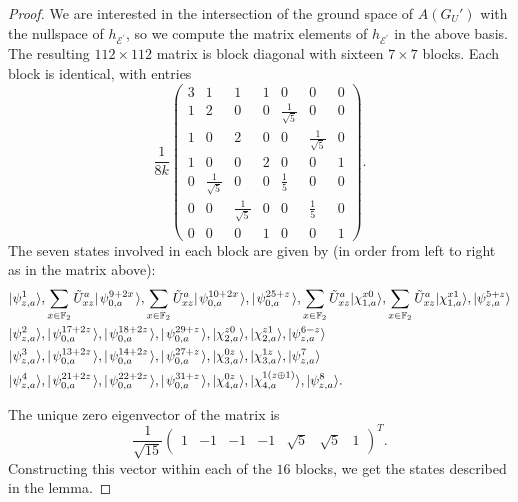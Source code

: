\documentclass[../thesis-main/thesis-main]{subfiles}
\begin{document}
\begin{proof}
We are interested in the intersection of the ground space of $A(G_U')$ with the nullspace of $h_{\mathcal{E}^{\prime}}$, so we compute the matrix elements of $h_{\mathcal{E}^{\prime}}$ in the above basis. The resulting $112\times 112$ matrix is block diagonal with sixteen $7\times 7$ blocks. Each block is identical, with entries
\begin{equation} \frac{1}{8k}
\begin{pmatrix}
  3 & 1 & 1 &1 & 0 & 0 & 0\\ 
  1 & 2 & 0 & 0 & \frac{1}{\sqrt{5}} & 0 & 0\\
  1 & 0 & 2 & 0 & 0 & \frac{1}{\sqrt{5}} & 0\\
  1 & 0 & 0 & 2 & 0 & 0 & 1\\
  0 & \frac{1}{\sqrt{5}} & 0 & 0 & \frac{1}{5} & 0 & 0\\
  0 & 0 & \frac{1}{\sqrt{5}} & 0 & 0 & \frac{1}{5} & 0\\
  0 & 0 & 0 & 1 & 0 & 0 & 1
\end{pmatrix}.\label{eq:three_by_three_blocks}
\end{equation}
The seven states involved in each block are given by (in order from left to right as in the matrix above):
\begin{align}
 & |\psi_{z,a}^{1}\rangle,  \sum_{x\in\mathbb{F}_2} \tilde{U}^a_{xz}  |\mspace{2mu} \psi_{0,a}^{9 + 2 x} \mspace{2mu} \rangle, \sum_{x\in\mathbb{F}_2} \tilde{U}^a_{xz}  |\mspace{2mu} \psi_{0,a}^{10 + 2 x} \mspace{2mu} \rangle,
     |\mspace{2mu} \psi_{0,a}^{25+z} \mspace{2mu} \rangle,\sum_{x\in\mathbb{F}_2}\tilde{U}^a_{xz}|\chi_{1,a}^{x0}\rangle,\sum_{x\in\mathbb{F}_2}\tilde{U}^a_{xz}|\chi_{1,a}^{x1}\rangle,|\psi_{z,a}^{5+z}\rangle\\
 & |\psi_{z,a}^{2}\rangle,|\mspace{2mu} \psi_{0,a}^{17+2z} \mspace{2mu} \rangle, |\mspace{2mu} \psi_{0,a}^{18+2z} \mspace{2mu} \rangle, |\mspace{2mu} \psi_{0,a}^{29+z} \mspace{2mu} \rangle,|\chi_{2,a}^{z0}\rangle,|\chi_{2,a}^{z1}\rangle,|\psi_{z,a}^{6-z}\rangle\\
 & |\psi_{z,a}^{3}\rangle,|\mspace{2mu} \psi_{0,a}^{13+2z} \mspace{2mu} \rangle, |\mspace{2mu} \psi_{0,a}^{14+2z} \mspace{2mu} \rangle, |\mspace{2mu} \psi_{0,a}^{27+z} \mspace{2mu} \rangle,|\chi_{3,a}^{0z}\rangle,|\chi_{3,a}^{1z}\rangle,|\psi_{z,a}^{7}\rangle\\
 & |\psi_{z,a}^{4}\rangle,|\mspace{2mu} \psi_{0,a}^{21+2z} \mspace{2mu} \rangle, |\mspace{2mu} \psi_{0,a}^{22+2z} \mspace{2mu} \rangle, |\mspace{2mu} \psi_{0,a}^{31+z} \mspace{2mu} \rangle,|\chi_{4,a}^{0z}\rangle,|\chi_{4,a}^{1\left(z\oplus1\right)}\rangle,|\psi_{z,a}^{8}\rangle.
\end{align}

The unique zero eigenvector of the matrix  is 
\begin{equation}
  \frac{1}{\sqrt{15}} \begin{pmatrix}
  1 & -1 & -1 & -1 & \sqrt{5} & \sqrt{5} & 1
  \end{pmatrix}^T.
\end{equation}
Constructing this vector within each of the $16$ blocks, we get the states described in the lemma. 
\end{proof}
\end{document}
